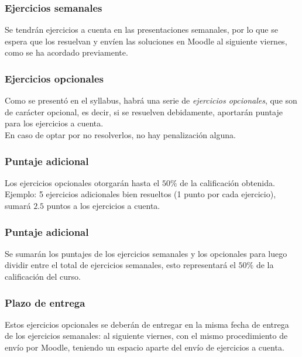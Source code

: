 \documentclass[12pt]{beamer}
\begin{document}
\begin{frame}
\frametitle{Ejercicios semanales}
Se tendrán ejercicios a cuenta en las presentaciones semanales, por lo que se espera que los resuelvan y envíen las soluciones en Moodle al siguiente viernes, como se ha acordado previamente.
\end{frame}
\begin{frame}
\frametitle{Ejercicios opcionales}
Como se presentó en el syllabus, habrá una serie de \emph{ejercicios opcionales}, que son de carácter opcional, es decir, si se resuelven debidamente, aportarán puntaje para los ejercicios a cuenta.
\\
\bigskip
\pause
En caso de optar por no resolverlos, no hay penalización alguna.
\end{frame}
\begin{frame}
\frametitle{Puntaje adicional}
Los ejercicios opcionales otorgarán hasta el $50\%$ de la calificación obtenida.
\\
\bigskip
\pause
Ejemplo: 5 ejercicios adicionales bien resueltos (1 punto por cada ejercicio), sumará $2.5$ puntos a los ejercicios a cuenta.
\end{frame}
\begin{frame}
\frametitle{Puntaje adicional}
Se sumarán los puntajes de los ejercicios semanales y los opcionales para luego dividir entre el total de ejercicios semanales, esto representará el 
$50\%$ de la calificación del curso.
\end{frame}
\begin{frame}
\frametitle{Plazo de entrega}
Estos ejercicios opcionales se deberán de entregar en la misma fecha de entrega de los ejercicios semanales: al siguiente viernes, con el mismo procedimiento de envío por Moodle, teniendo un espacio aparte del envío de ejercicios a cuenta.
\end{frame}
\end{document}

